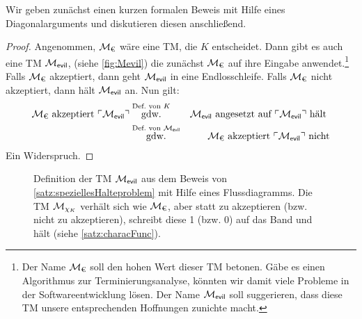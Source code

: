 Wir geben zunächst einen kurzen formalen Beweis mit Hilfe eines Diagonalarguments
und diskutieren diesen anschließend.
\begin{proof}
  Angenommen, $\mathcal{M}_\text{€}$ wäre eine \ac{TM}, die $K$ entscheidet.
  Dann gibt es auch eine \ac{TM} $\mathcal{M}_\textsf{evil}$, (siehe \autoref{fig:Mevil})
  die zunächst $\mathcal{M}_\text{€}$ auf ihre Eingabe anwendet.\footnote{
  Der Name $\mathcal{M}_\text{€}$ soll den hohen Wert dieser \ac{TM} betonen.
  Gäbe es einen Algorithmus zur Terminierungsanalyse, könnten wir damit viele Probleme in der Softwareentwicklung lösen.
  Der Name $\mathcal{M}_\textsf{evil}$ soll suggerieren, dass diese \ac{TM} unsere entsprechenden Hoffnungen zunichte macht.
  }
  Falls $\mathcal{M}_\text{€}$ akzeptiert, dann geht $\mathcal{M}_\textsf{evil}$ in eine Endlosschleife. 
  Falls $\mathcal{M}_\text{€}$ nicht akzeptiert, dann hält $\mathcal{M}_\textsf{evil}$ an. Nun gilt:
  \begin{eqnarray*}
  \mathcal{M}_\text{€} \text{ akzeptiert } \ulcorner \mathcal{M}_\textsf{evil} \urcorner 
  &\stackrel{\text{Def.\ von } K}{\text{gdw.}} & \mathcal{M}_\textsf{evil} \text{ angesetzt auf } \ulcorner \mathcal{M}_\textsf{evil} \urcorner \text{ hält }\\
  &\stackrel{\text{Def.\ von } \mathcal{M}_\textsf{evil}}{\text{gdw.}} & \mathcal{M}_\text{€} \text{ akzeptiert } \ulcorner \mathcal{M}_\textsf{evil} \urcorner \text{ nicht}
  \end{eqnarray*}
  Ein Widerspruch.
\end{proof}

 \begin{figure}[H]\centering
  \caption{Definition der \ac{TM} $\mathcal{M}_\textsf{evil}$ aus dem Beweis von \autoref{satz:speziellesHalteproblem} mit Hilfe eines Flussdiagramms.
  Die \ac{TM} $\mathcal{M}_{\chi_K}$ verhält sich wie $\mathcal{M}_\text{€}$, aber statt zu akzeptieren (bzw. nicht zu akzeptieren), schreibt diese 1 (bzw. 0) auf das Band und hält (siehe \autoref{satz:characFunc}).}
  \label{fig:Mevil}
 \end{figure}




